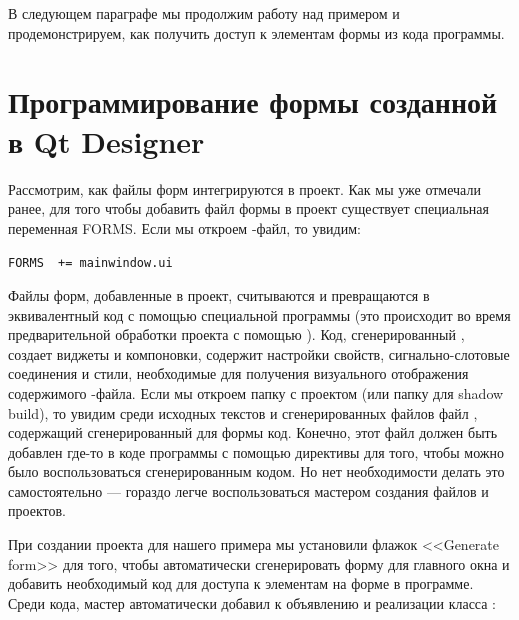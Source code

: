 В следующем параграфе мы продолжим работу над примером и продемонстрируем, как получить доступ к элементам формы из кода
программы.

\section[Программирование формы созданной в Qt Designer]{Программирование формы созданной в Qt Designer}
Рассмотрим, как файлы форм интегрируются в проект. Как мы уже отмечали ранее, для того чтобы добавить
файл формы в проект существует специальная переменная FORMS. Если мы откроем -файл, то увидим: 

\lstinline!FORMS  += mainwindow.ui!

Файлы форм, добавленные в проект, считываются и превращаются в эквивалентный  код с помощью 
специальной программы 
(это происходит во время предварительной обработки проекта с помощью ). 
Код, сгенерированный , создает виджеты и
компоновки, содержит настройки свойств, сигнально-слотовые соединения и стили, необходимые для получения визуального
отображения содержимого -файла. Если мы откроем папку с проектом (или папку для shadow build), то увидим среди исходных текстов и сгенерированных файлов файл , содержащий сгенерированный для формы код.
Конечно, этот файл должен быть добавлен где-то в коде программы с помощью директивы  для того, чтобы можно
было воспользоваться сгенерированным кодом. Но нет необходимости делать это самостоятельно --- гораздо легче
воспользоваться мастером создания файлов и проектов. 

При создании проекта для нашего примера мы установили флажок <<Generate form>> для того, чтобы автоматически сгенерировать
форму для главного окна и добавить необходимый код для доступа к элементам на форме в программе. Среди кода, мастер
автоматически добавил к объявлению и реализации класса : 

